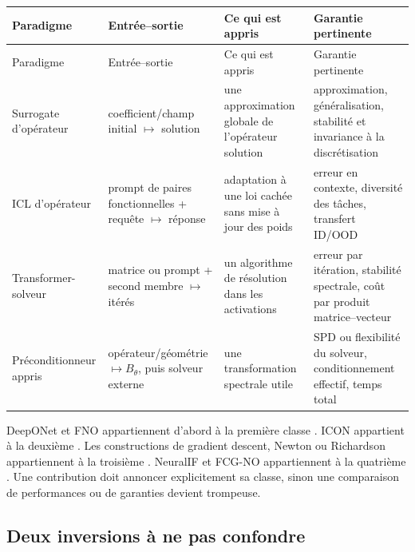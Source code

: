 \documentclass[11pt,a4paper]{article}
\begin{document}
\begin{longtable}{p{}p{}p{}p{}}
\toprule
Paradigme & Entrée--sortie & Ce qui est appris & Garantie pertinente \\
\midrule
\endfirsthead
\toprule
Paradigme & Entrée--sortie & Ce qui est appris & Garantie pertinente \\
\midrule
\endhead
Surrogate d'opérateur & coefficient/champ initial $\mapsto$ solution & une
approximation globale de l'opérateur solution & approximation, généralisation,
stabilité et invariance à la discrétisation \\
ICL d'opérateur & prompt de paires fonctionnelles + requête $\mapsto$ réponse &
adaptation à une loi cachée sans mise à jour des poids & erreur en contexte,
diversité des tâches, transfert ID/OOD \\
Transformer-solveur & matrice ou prompt + second membre $\mapsto$ itérés & un
algorithme de résolution dans les activations & erreur par itération, stabilité
spectrale, coût par produit matrice--vecteur \\
Préconditionneur appris & opérateur/géométrie $\mapsto B_\theta$, puis solveur
externe & une transformation spectrale utile & SPD ou flexibilité du solveur,
conditionnement effectif, temps total \\
\bottomrule
\end{longtable}

DeepONet et FNO appartiennent d'abord à la première classe
\cite{lu2021deeponet,li2021fno,kovachki2023neuraloperator}. ICON appartient à la
deuxième \cite{yang2023icon,yang2024icongeneralization}. Les constructions de
gradient descent, Newton ou Richardson appartiennent à la troisième
\cite{vonoswald2023,fu2024secondorder,yan2026richardson}. NeuralIF et FCG-NO
appartiennent à la quatrième
\cite{hausner2023neuralif,rudikov2024fcgno}. Une contribution doit annoncer
explicitement sa classe, sinon une comparaison de performances ou de garanties
devient trompeuse.

\subsection{Deux inversions à ne pas confondre}
\end{document}
